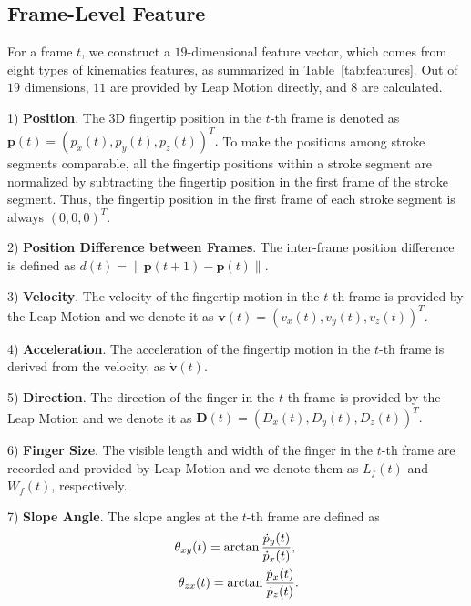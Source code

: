 \subsection{Frame-Level Feature}

For a frame $t$, we construct a $19$-dimensional feature vector, which comes from
eight types of kinematics features, as summarized in Table~\ref{tab:features}.  Out of $19$ dimensions, $11$ are provided by Leap Motion directly, and $8$ are calculated.


1) \textbf{Position}.
The 3D fingertip position in the $t$-th frame is denoted as $\textbf{p}(t)= (p_x(t),p_y(t), p_z(t))^T.$
To make the positions among stroke segments comparable, all the fingertip positions within a stroke segment
are normalized by subtracting the fingertip position 
in the first frame of the stroke segment. Thus, the fingertip position
in the first frame of each stroke segment is always $(0,0,0)^T$.

2) \textbf{Position Difference between Frames}.
The inter-frame position difference is  defined as
$d(t)=\|\textbf{p}(t+1)-\textbf{p}(t)\|.$

3) \textbf{Velocity}.
The velocity of the fingertip motion in the $t$-th frame is provided by the Leap Motion
and we denote it as ${{\textbf{v}}}(t) = ({{v}}_x(t),{{v}}_y(t), {{v}}_z(t))^T.$

4) \textbf{Acceleration}.
The acceleration of the fingertip motion in the $t$-th frame
is derived from the velocity, as ${\dot{\textbf{v}}}(t).$

5) \textbf{Direction}.
The direction of the finger in the $t$-th frame is provided by the Leap Motion
and we denote it as ${{\textbf{D}}}(t) = ({{D}}_x(t),{{D}}_y(t), {{D}}_z(t))^T.$

6) \textbf{Finger Size}.
The visible length and width of the finger in the $t$-th frame are recorded and provided by Leap Motion and we denote them as  $L_{f}(t)$
and $W_{f}(t)$, respectively.

7) \textbf{Slope Angle}.
The slope angles at the $t$-th frame are defined as
\begin{align}  \scriptsize
\theta_{xy}(t)=\arctan\frac{{\dot{p}}_y(t)}{{\dot{p}}_x(t)},\notag  \; \\ \notag
\theta_{zx}(t)=\arctan\frac{{\dot{p}}_x(t)}{{\dot{p}}_z(t)}. \notag
\end{align}


